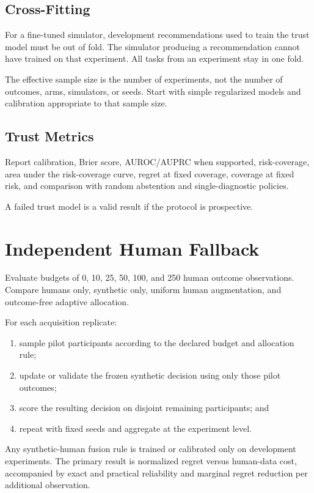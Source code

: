 \documentclass[11pt]{article}
\begin{document}
\subsection{Cross-Fitting}

For a fine-tuned simulator, development recommendations used to train the trust model must be out of fold. The simulator producing a recommendation cannot have trained on that experiment. All tasks from an experiment stay in one fold.

The effective sample size is the number of experiments, not the number of outcomes, arms, simulators, or seeds. Start with simple regularized models and calibration appropriate to that sample size.

\subsection{Trust Metrics}

Report calibration, Brier score, AUROC/AUPRC when supported, risk-coverage, area under the risk-coverage curve, regret at fixed coverage, coverage at fixed risk, and comparison with random abstention and single-diagnostic policies.

A failed trust model is a valid result if the protocol is prospective.

\section{Independent Human Fallback}

Evaluate budgets of 0, 10, 25, 50, 100, and 250 human outcome observations. Compare humans only, synthetic only, uniform human augmentation, and outcome-free adaptive allocation.

For each acquisition replicate:

\begin{enumerate}
\item sample pilot participants according to the declared budget and allocation rule;
\item update or validate the frozen synthetic decision using only those pilot outcomes;
\item score the resulting decision on disjoint remaining participants; and
\item repeat with fixed seeds and aggregate at the experiment level.
\end{enumerate}

Any synthetic-human fusion rule is trained or calibrated only on development experiments. The primary result is normalized regret versus human-data cost, accompanied by exact and practical reliability and marginal regret reduction per additional observation.
\end{document}
